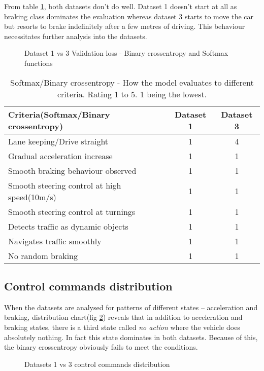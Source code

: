 From table \ref{table:softmaxandbce}, both datasets don't do well. Dataset 1 doesn't start
at all as braking class dominates the evaluation whereas dataset 3 starts to move the car
but resorts to brake indefinitely after a few metres of driving. This behaviour
necessitates further analysis into the datasets.
\begin{figure}[!ht]
	\centering
    \def\svgwidth{\textwidth}
    
    \caption{Dataset 1 vs 3 Validation loss - Binary crossentropy and Softmax functions}
    \label{fig:ds1andd3SoftactivatonBCE}
\end{figure}

\begin{table}[!ht]
    \centering
\begin{tabular}{lcc}
    \toprule
    Criteria(Softmax/Binary crossentropy)  & Dataset 1 & Dataset 3 \\\midrule
    Lane keeping/Drive straight  & 1 & 4  \\
    Gradual acceleration increase & 1 & 1\\
    Smooth braking behaviour observed & 1 & 1 \\
    Smooth steering control at high speed(10m/s) & 1 & 1 \\
    Smooth steering control at turnings & 1 & 1\\
    Detects traffic as dynamic objects & 1 & 1\\
    Navigates traffic smoothly & 1 & 1\\
    No random braking & 1 & 1 \\\bottomrule
\end{tabular}
\caption{Softmax/Binary crossentropy - How the model evaluates to different criteria.
Rating 1 to 5. 1 being the lowest.}
\label{table:softmaxandbce}
\end{table}
\subsection*{Control commands distribution}
When the datasets are analysed for patterns of different states -- acceleration and
braking, distribution chart(fig \ref{fig:datasetscomparectrlcmds}) reveals that in addition to
acceleration and braking states, there is a third state called \textit{no action} where
the vehicle does absolutely nothing. In fact this state dominates in both datasets.
Because of this, the binary crossentropy obviously fails to meet the conditions.
\begin{figure}[!ht]
    \centering
    \def\svgwidth{\textwidth}
    
    \caption{Datasets 1 vs 3 control commands distribution}
    \label{fig:datasetscomparectrlcmds}
\end{figure}

